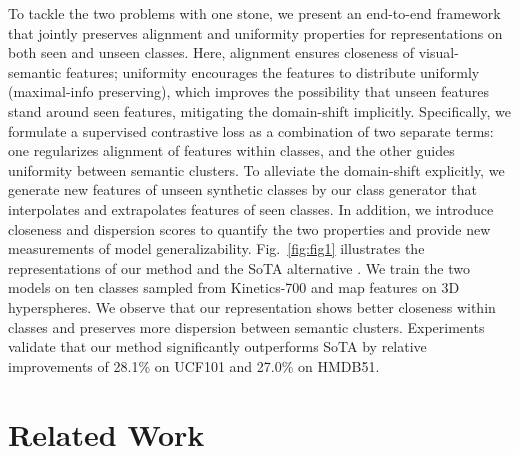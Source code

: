 \documentclass[10pt,twocolumn,letterpaper]{article}
\begin{document}
To tackle the two problems with one stone, we present an end-to-end framework that jointly preserves alignment and uniformity properties for representations on both seen and unseen classes.
Here, alignment ensures closeness of visual-semantic features; uniformity encourages the features to distribute uniformly (maximal-info preserving), which improves the possibility that unseen features stand around seen features, mitigating the domain-shift implicitly.
Specifically, we formulate a supervised contrastive loss as a combination of two separate terms: one regularizes alignment of features within classes, and the other guides uniformity between semantic clusters.
To alleviate the domain-shift explicitly, we generate new features of unseen synthetic classes by our class generator that interpolates and extrapolates features of seen classes. 
In addition, we introduce closeness and dispersion scores to quantify the two properties and provide new measurements of model generalizability.
Fig.~\ref{fig:fig1} illustrates the representations of our method and the SoTA alternative \cite{brattoli2020rethinking}.
We train the two models on ten classes sampled from Kinetics-700 \cite{carreira2017quo} and map features on 3D hyperspheres.
We observe that our representation shows better closeness within classes and preserves more dispersion between semantic clusters.
Experiments validate that our method significantly outperforms SoTA by relative improvements of 28.1\% on UCF101 and 27.0\% on HMDB51.










\section{Related Work}
\label{sec:relatedwork}
\end{document}
